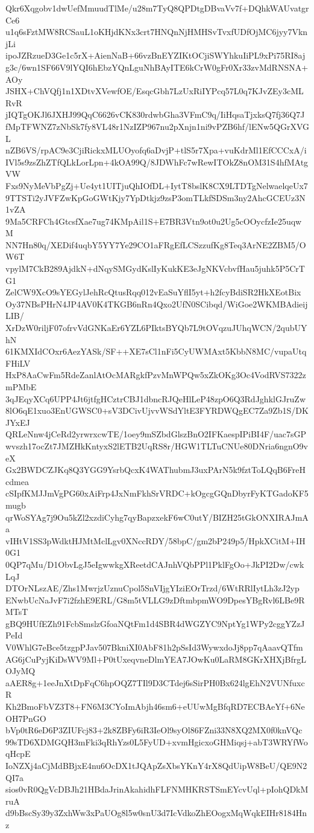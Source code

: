 Qkr6Xqgobv1dwUefMmuudTlMe/u28m7TyQ8QPDtgDBvaVv7f+DQhkWAUvatgrCe6
u1q6sFztMW8RCSauL1oKHjdKNx3crt7HNQnNjHMHSvTvxfUDfOjMC6jyy7VknjLi
ipoJZRzueD3Ge1c5rX+AienNaB+66vzBnEYZIKtOCjiSWYhkuIiPL9xPi75RI8aj
g3c/6wn1SF66V9lYQI6hEbzYQnLguNhBAyITE6kCrW0gFr0Xr33zvMdRNSNA+AOy
JSHX+ChVQfj1n1XDtvXVewfOE/EsqcGbh7LzUxRiIYPcq57L0q7KJvZEy3cMLRvR
jIQTgOKJl6JXHJ99QqC6626vCK830rdwbGha3VFmC9q/IiHqsaTjxksQ7fj36Q7J
fMpTFWNZ7zNbSk7fy8VL48r1NzIZP967nu2pXnjn1ni9vPZB6hf/lENw5QGrXVGL
nZB6VS/rpAC9e3CjiRickxMLUOyofq6aDvjP+tlS5r7Xpa+vuKdrMl1EfCCCxA/i
IVl5s9zsZhZTfQLkLorLpn+4kOA99Q/8JDWhFc7wRewITOkZ8nOM31S4hfMAtgVW
Fxs9NyMeVbPgZj+Ue4yt1UITjuQhIOfDL+IytT8bslK8CX9LTDTgNelwaelqeUx7
9TTSTi2yJVFZwKpGoGWtKjy7YpDtkjz9zsP3omTLkfSDSm3ny2AhcGCEUz3N1vZA
9Ma5CRFCh4GtcsfXae7ug74KMpAil1S+E7BR3Vtn9ot0u2Ug5cOOycfzIe25uqwM
NN7Hn80q/XEDif4uqbY5YY7Ye29CO1aFRgEfLCSzzufKg8Teq3ArNE2ZBM5/OW6T
vpylM7CkB289AjdkN+dNqySMGydKslIyKukKE3eJgNKVcbvfHau5juhk5P5CrTG1
ZelCW9XcO9sYEGylJehRcQtusRqq012vEaSuYflI5yt+h2fcyBdiSR2HkXEotBix
Oy37NBsPHrN4JP4AV0K4TKGB6nRn4Qxo2UfN0SCibqd/WiGoe2WKMBAdieijLIB/
XrDzW0riljF07ofrvVdGNKaEr6YZL6PIktsBYQb7L9tOVqzuJUhqWCN/2qubUYhN
61KMXIdCOxr6AezYASk/SF++XE7sCl1nFi5CyUWMAxt5KbbN8MC/vupaUtqFHiLV
HxP8AaCwFm5RdeZanlAtOcMARgkfPzvMnWPQw5xZkOKg3Oc4VodRVS7322zmPMbE
3qJEqyXCq6UPP4Jt6jtfgHCztrCBJ1dbncRJQeHlLeP48zpO6Q3RdJghklGJruZw
8lO6qE1xuo3EnUGWSC0+sV3DCivUjvvWSdYltE3FYRDWQgEC7Za9Zb1S/DKJYxEJ
QRLeNnw4jCeRd2yrwrxcwTE/1oey9mSZbdGlszBnO2IFKaespIPiBI4F/uac7sGP
wvszh17ocZt7JMZHkKntyxS2lETB2UqRS8r/HGW1TLTuCNUe80DNria6ngnO9veX
Gx2BWDCZJKq8Q3YGG9YsrbQcxK4WAThubmJ3uxPArN5k9fztToLQqB6FreHcdmea
cSIpfKMJJmVgPG60xAiFrp4JxNmFkhSrVRDC+kOgcgGQnDbyrFyKTGadoKF5mugb
qrWoSYAg7j9Ou5kZl2xzdiCyhg7qyBapzxekF6wC0utY/BIZH25tGkONXIRAJmAa
vIHtV1SS3pWdktHJMtMclLgv0XNccRDY/58bpC/gm2bP249p5/HpkXCitM+IH0G1
0QP7qMu/D1ObvLgJ5eIgwwkgXReetdCAJnhVQbPPl1PklFgOo+JkPI2Dw/cwkLqJ
DTOrNLszAE/Zhs1MwrjzUznuCpol5SnVIjgYIziEOrTrzd/6WtRRlIytLh3zJ2yp
ENwbUcNaJvF7i2fzhE9ERL/G8m5tVLLG9zDftmbpmWO9DpesYBgRvl6LBe9RMTsT
gBQ9HUfEZh91FcbSmslzGfoaNQtFm1d4SBR4dWGZYC9NptYg1WPy2cggYZzJPeId
V0WhlG7eBce5tzgpPJav507BkniXI0AbF81h2pSsId3WywxdoJj8pp7qAaavQTfm
AG6jCuPyjKiDsWV9Ml+P0tUxeqvneDlmYEA7JOwKu0LaRM8GKrXHXjBfrgLOJyMQ
aAER8g+1eeJnXtDpFqC6hpOQZ7TIl9D3CTdej6sSirPH0Bx624lgEhN2VUNfuxcR
Kh2BmoFbVZ3T8+FN6M3CYoImAbjh46sm6+eUUwMgBfqRD7ECBAeYf+6NeOH7PnGO
bVp0tR6eD6P3ZIUFcj83+2k8ZBFy6iR3IeOl9syOl86FZni33N8XQ2MX0f0knVQc
99sTD6XDMGQH3mFki3qRhYzs0L5FyUD+xvmHgicxoGHMiqsj+abT3WRYfWoqHcpE
IoNZXj4aCjMdBBjxE4nu6OcDX1tJQApZsXbsYKnY4rX8QdUipW8BeU/QE9N2QI7a
sios0vR0QgVcDBJh21HBdaJrinAkahidhFLFNMHKRSTSmEYcvUql+pIohQDkMruA
d9bBscSy39y3ZxhWw3xPaUOg8l5w0snU3d7IcVdkoZhEOogxMqWqkEIHr8184Hnz
